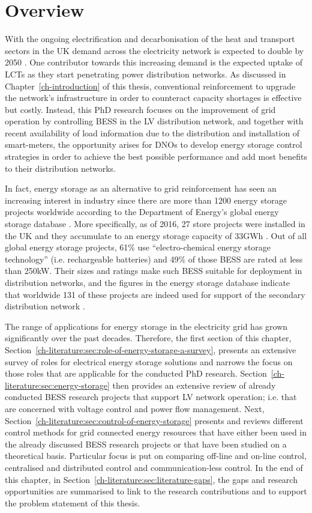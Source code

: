 \section{Overview}
\label{ch-literature:sec:overview}

With the ongoing electrification and decarbonisation of the heat and transport sectors in the UK demand across the electricity network is expected to double by 2050 \cite{Wilks2010}.
One contributor towards this increasing demand is the expected uptake of LCTs as they start penetrating power distribution networks.
As discussed in Chapter~\ref{ch-introduction} of this thesis, conventional reinforcement to upgrade the network's infrastructure in order to counteract capacity shortages is effective but costly.
Instead, this PhD research focuses on the improvement of grid operation by controlling BESS in the LV distribution network, and together with recent availability of load information due to the distribution and installation of smart-meters, the opportunity arises for DNOs to develop energy storage control strategies in order to achieve the best possible performance and add most benefits to their distribution networks.

In fact, energy storage as an alternative to grid reinforcement has seen an increasing interest in industry since there are more than 1200 energy storage projects worldwide according to the Department of Energy's global energy storage database \cite{DOE-GESD}.
More specifically, as of 2016, 27 store projects were installed in the UK and they accumulate to an energy storage capacity of 33GWh \cite{Garton2016}.
Out of all global energy storage projects, 61\% use ``electro-chemical energy storage technology'' (i.e. rechargeable batteries) and 49\% of those BESS are rated at less than 250kW.
Their sizes and ratings make such BESS suitable for deployment in distribution networks, and the figures in the energy storage database indicate that worldwide 131 of these projects are indeed used for support of the secondary distribution network \cite{DOE-GESD}.

The range of applications for energy storage in the electricity grid has grown significantly over the past decades.
Therefore, the first section of this chapter, Section~\ref{ch-literature:sec:role-of-energy-storage-a-survey}, presents an extensive survey of roles for electrical energy storage solutions and narrows the focus on those roles that are applicable for the conducted PhD research.
Section~\ref{ch-literature:sec:energy-storage} then provides an extensive review of already conducted BESS research projects that support LV network operation; i.e. that are concerned with voltage control and power flow management.
Next, Section~\ref{ch-literature:sec:control-of-energy-storage} presents and reviews different control methods for grid connected energy resources that have either been used in the already discussed BESS research projects or that have been studied on a theoretical basis.
Particular focus is put on comparing off-line and on-line control, centralised and distributed control and communication-less control.
In the end of this chapter, in Section~\ref{ch-literature:sec:literature-gaps}, the gaps and research opportunities are summarised to link to the research contributions and to support the problem statement of this thesis.
